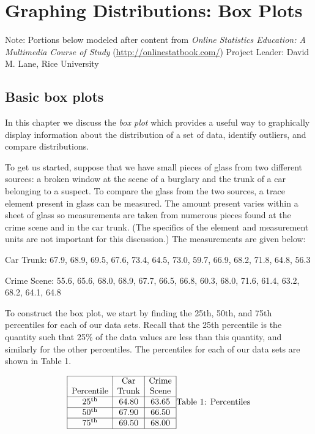 \documentclass[
]{book}
\begin{document}
\hypertarget{graphing-distributions-box-plots}{%
\chapter{Graphing Distributions: Box Plots}\label{graphing-distributions-box-plots}}

Note: Portions below modeled after content from
\emph{Online Statistics Education: A Multimedia Course of Study}
(\url{http://onlinestatbook.com/}) Project Leader: David M. Lane, Rice University

\hypertarget{basic-box-plots}{%
\section{Basic box plots}\label{basic-box-plots}}

In this chapter we discuss the \emph{box plot} which provides a useful way to graphically
display information about the distribution of a set of data,
identify outliers, and compare distributions.

To get us started, suppose that we have small pieces of glass from two different
sources: a broken window at the scene of a burglary and the trunk of a car
belonging to a suspect. To compare the glass from the two sources, a trace
element present in glass can be measured. The amount present varies within
a sheet of glass so measurements are taken from numerous pieces found at the
crime scene and in the car trunk. (The specifics of the element and measurement
units are not important for this discussion.) The measurements are given below:

Car Trunk: 67.9, 68.9, 69.5, 67.6, 73.4, 64.5, 73.0, 59.7, 66.9, 68.2, 71.8, 64.8, 56.3

Crime Scene: 55.6, 65.6, 68.0, 68.9, 67.7, 66.5, 66.8, 60.3, 68.0, 71.6, 61.4, 63.2, 68.2, 64.1, 64.8

To construct the box plot, we start by finding the 25th, 50th, and 75th percentiles
for each of our data sets. Recall that the 25th percentile is the quantity such
that 25\% of the data values are less than this quantity, and similarly for the
other percentiles. The percentiles for each of our data sets are shown in
Table 1.

\[
\begin{array}{|c|c|c|} \hline
& \mathrm{Car} & \text{Crime}  \\
\text{Percentile} & \mathrm{Trunk} & \text{Scene}  \\ \hline
25^{\text{th}} & 64.80 & 63.65  \\  \hline
50^{\text{th}}  & 67.90 & 66.50  \\  \hline
75^{\text{th}} & 69.50 & 68.00  \\  \hline
\end{array}\\
\mbox{Table 1: Percentiles}
\]
\end{document}
